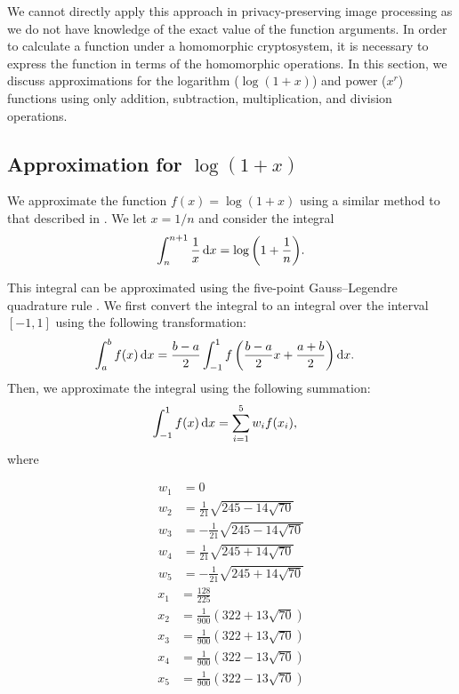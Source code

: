 We cannot directly apply this approach in privacy-preserving image processing as we do not have knowledge of the exact value of the function arguments. In order to calculate a function under a  homomorphic cryptosystem, it is necessary to express the function in terms of the homomorphic operations.
In this section, we discuss approximations for the logarithm ($\log(1+x)$) and power ($x^r$) functions using only addition, subtraction, multiplication, and division operations.

\subsection{Approximation for $\log(1+x)$}
\label{sec:logapproximation}
We approximate the function $f(x)=\log(1+x)$ using a similar method to that described in
\cite{khattri_new_2009}.
We let $x = 1/n$ and consider the integral
\begin{equation}
	\label{eq:log_integral}
  	\int_{n}^{n+1}{\frac{1}{x}\mathop{}\!\mathrm{d} x}=\log{\left(1+\frac{1}{n}\right)}.
\end{equation}

This integral can be approximated using the five-point Gauss--Legendre quadrature rule \cite{kythe_quadrature_2002}. We first convert the integral to an integral over the interval $[-1,1]$ using the following transformation:
\begin{align*}
	\int_a^b{f(x)\mathop{}\!\mathrm{d} x}
	&= \frac{b-a}{2}\int_{-1}^{1}{f\left(\frac{b-a}{2}x+\frac{a+b}{2}\right)\mathop{}\!\mathrm{d} x}.
\end{align*}
Then, we approximate the integral using the following summation:
\begin{align*}
  \int_{-1}^{1}{f(x)\mathop{}\!\mathrm{d} x} &= \sum_{i=1}^{5}{w_if(x_i)},
\end{align*}
where
\begin{multicols}{2}
	\noindent
	\begin{align*}
		w_1 &= 0\\
		w_2 &= \frac{1}{21}\sqrt{245-14\sqrt{70}}\\
		w_3 &= -\frac{1}{21}\sqrt{245-14\sqrt{70}}\\
		w_4 &= \frac{1}{21}\sqrt{245+14\sqrt{70}}\\
		w_5 &= -\frac{1}{21}\sqrt{245+14\sqrt{70}}
	\end{align*}
	\begin{align*}
		x_1 &= \frac{128}{225}\\
		x_2 &= \frac{1}{900}\left( 322 + 13\sqrt{70}\right)\\
		x_3 &= \frac{1}{900}\left( 322 + 13\sqrt{70}\right)\\
		x_4 &= \frac{1}{900}\left( 322 - 13\sqrt{70}\right)\\
		x_5 &= \frac{1}{900}\left( 322 - 13\sqrt{70}\right)
	\end{align*}
\end{multicols}

